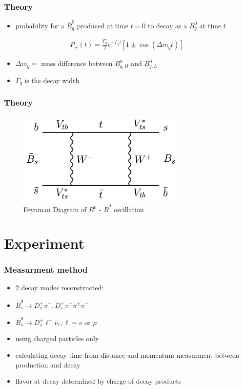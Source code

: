 \documentclass{beamer}
\begin{document}
\begin{frame}
	\frametitle{Theory}
	\begin{itemize}
		\item probability for a $\bar{B}^0_q$ produced at time $t=0$ to decay as a $B^0_q$ at time $t$
	\end{itemize}
	\begin{align*}
		P_\pm (t) = \frac{\Gamma_q}{2} e^{-\Gamma_q t} \left[1 \pm \cos(\Delta m_q t) \right]
	\end{align*}
	\begin{itemize}
		\item $\Delta m_q = $ mass difference between $B^0_{q,H}$ and $B^0_{q,L}$
		\item $\Gamma_q$ is the decay width
	\end{itemize}
\end{frame}

\begin{frame}
	\frametitle{Theory}
	\begin{figure}
		\includegraphics[width=0.75\textwidth]{B_mixing}
		\caption{Feynman Diagram of $B^0$ - $\bar{B}^0$ oscillation}
		\label{fig:mixing}
	\end{figure}
\end{frame}


\section{Experiment}
\begin{frame}
	\frametitle{Measurment method}
	\begin{itemize}
		\item 2 decay modes reconstructed:
		\item $\bar{B}^0_s \rightarrow D^+_s \pi^- , D^+_s \pi^- \pi^+ \pi^-$
		\item $\bar{B}^0_s \rightarrow D^+_s \ell^- \bar{\nu}_\ell, \ell = e$ or $\mu$
		\item using charged particles only
		\item calculating decay time from distance and momentum measurment between production and decay
		\item flavor at decay determined by charge of decay products
	\end{itemize}
\end{frame}
\end{document}

